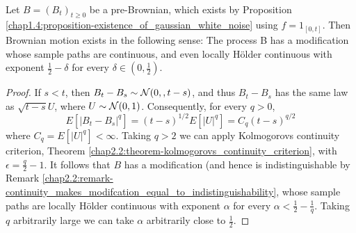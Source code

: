 \begin{corollary}\label{chap2.2:corollary-brownian_motion_exists}
 \\
Let $B = (B_t)_{t \geq 0}$ be a pre-Brownian, which exists by Proposition \ref{chap1.4:proposition-existence_of_gaussian_white_noise} using $f = 1_{[0,t]}$. Then Brownian motion exists in the following sense:
The process B has a modification whose sample paths are continuous, and even locally Hölder continuous with exponent $\frac{1}{2}-\delta$ for every $\delta \in (0,\frac{1}{2})$.
\end{corollary}
\begin{proof}
If $s<t$, then $B_t-B_s \sim \mathcal{N}(0,,t-s)$, and thus $B_t-B_s$ has the same law as $\sqrt{t-s}U$, where $U \sim \mathcal{N}(0,1)$. Consequently, for every $q >0$,
$$E[|B_t-B_s|^q]=(t-s)^{1/2}E[|U|^q]=C_q(t-s)^{q/2}$$
where $C_q=E[|U|^q]<\infty$. Taking $q > 2$ we can apply Kolmogorovs continuity criterion, Theorem \ref{chap2.2:theorem-kolmogorovs_continuity_criterion}, with $\epsilon = \frac{q}{2}-1$. It follows that $B$ has a modification (and hence is indistinguishable by Remark \ref{chap2.2:remark-continuity_makes_modifcation_equal_to_indistinguishability}, whose sample paths are locally Hölder continuous with exponent $\alpha$ for every $\alpha < \frac{1}{2}-\frac{1}{q}$. Taking $q$ arbitrarily large we can take $\alpha$ arbitrarily close to $\frac12$.
\end{proof}



